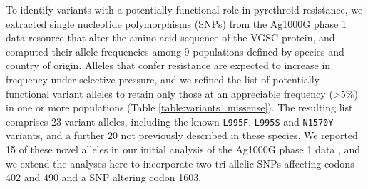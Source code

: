 \documentclass[a4paper,11pt,abstracton,hidelinks]{scrartcl}
\begin{document}
%
To identify variants with a potentially functional role in pyrethroid resistance, we extracted single nucleotide polymorphisms (SNPs) from the Ag1000G phase 1 data resource that alter the amino acid sequence of the VGSC protein, and computed their allele frequencies among 9 populations defined by species and country of origin.
%
Alleles that confer resistance are expected to increase in frequency under selective pressure, and we refined the list of potentially functional variant alleles to retain only those at an appreciable frequency (>5\%) in one or more populations (Table \ref{table:variants_missense}).
%
The resulting list comprises 23 variant alleles, including the known \texttt{L995F}, \texttt{L995S} and \texttt{N1570Y} variants, and a further 20 not previously described in these species.
%
We reported 15 of these novel alleles in our initial analysis of the Ag1000G phase 1 data \cite{Ag1000gConsortium2017}, and we extend the analyses here to incorporate two tri-allelic SNPs affecting codons 402 and 490 and a SNP altering codon 1603.
\end{document}
